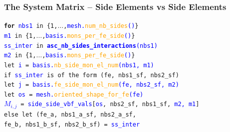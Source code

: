 \documentclass[compress]{beamer}
\begin{document}
\begin{frame}
  \frametitle{The System Matrix -- Side Elements vs Side Elements}

  \hspace{-.3cm}\texttt{\textbf{for} \textcolor{blue}{nbs1} in \{1,$\dots$,\textcolor{blue}{mesh.\textcolor{orange}{num\_nb\_sides}()}\}\\
    \hspace{0.5cm}\textcolor{blue}{m1} in \{1,$\dots$,\textcolor{blue}{basis.\textcolor{orange}{mons\_per\_fe\_side}()}\}\\
    \hspace{0.5cm}\textcolor{blue}{ss\_inter} in \textcolor{blue}{\large \textbf{asc\_nb\_sides\_interactions}(nbs1)}\\
    \hspace{0.5cm}\textcolor{blue}{m2} in \{1,$\dots$,\textcolor{blue}{basis.\textcolor{orange}{mons\_per\_fe\_side}()}\}\\
    \hspace{0.0cm}let \textcolor{blue}{i} = \textcolor{blue}{basis.\textcolor{orange}{nb\_side\_mon\_el\_num}(nbs1, m1)}\\
    \hspace{0.0cm}if \textcolor{blue}{ss\_inter} is of the form (\textcolor{green!50!black}{fe, nbs1\_sf, nbs2\_sf})\\
    \hspace{0.3cm}let \textcolor{blue}{j} = 
      \textcolor{blue}{basis.\textcolor{orange}{fe\_side\_mon\_el\_num}(\textcolor{green!50!black}{\small fe, nbs2\_sf}, m2)}\\
    \hspace{0.3cm}let \textcolor{blue}{os} = 
      \textcolor{blue}{mesh.\textcolor{orange}{oriented\_shape\_for\_fe}(\textcolor{green!50!black}{fe})}\\
    \hspace{0.3cm}\textcolor{blue}{$M_{i,j}$} = 
      {\small \textcolor{blue}{side\_side\_vbf\_vals}[\textcolor{blue}{os}, \textcolor{green!50!black}{nbs2\_sf, nbs1\_sf},
      \textcolor{blue}{m2, m1}]}\\
    \hspace{0.0cm}else let (\textcolor{green!50!black}{fe\_a, nbs1\_a\_sf, nbs2\_a\_sf,\\
    \hspace{2.0cm}fe\_b, nbs1\_b\_sf, nbs2\_b\_sf}) = \textcolor{blue}{ss\_inter}\\
}
\end{frame}
\end{document}
